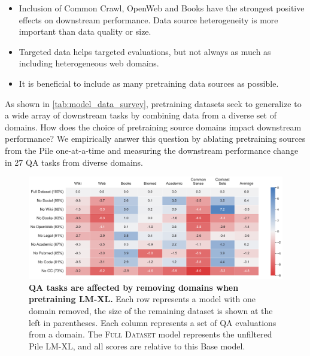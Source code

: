 \documentclass{article}
\newcommand{\emily}[1]{\textcolor{orange}{[emily: #1]}}
\newcommand{\bigLM}[0]{\textsc{LM-XL}}
\begin{document}
\begin{tcolorbox}[width=\textwidth,title={Section Findings}] %
\vspace{-2mm}
\begin{itemize}[itemsep=0pt, wide=3pt]
    \item Inclusion of Common Crawl, OpenWeb and Books have the strongest positive effects on downstream performance.
    Data source heterogeneity is more important than data quality or size.
    \item Targeted data %
    helps targeted evaluations, but not always as much as including heterogeneous web domains.  
    \item It is beneficial to include as many pretraining data sources as possible.
\end{itemize}
\end{tcolorbox}


As shown in \cref{tab:model_data_survey}, pretraining datasets seek to generalize to a wide array of downstream tasks by combining data from a diverse set of domains. 
How does the choice of pretraining source domains impact downstream performance?
We empirically answer this question by ablating pretraining sources from the Pile one-at-a-time and measuring the downstream performance change in 27 QA tasks from diverse domains.

\begin{figure}[ht]
    \centering
    \includegraphics[width=0.98\linewidth]{fables/domain/domain_heatmap_xl.pdf}
    \caption{
    \small
    \textbf{QA tasks are affected by removing domains when pretraining \bigLM{}.} 
    Each row represents a model with one domain removed, the size of the remaining dataset is shown at the left in parentheses.
    Each column represents a set of QA evaluations from a domain.
    The \textsc{Full Dataset} model represents the unfiltered Pile \bigLM, and all scores are relative to this Base model. 
    }
    \vspace{-3mm}
    \label{fig:domain-heatmap-xl}
\end{figure}
\end{document}
